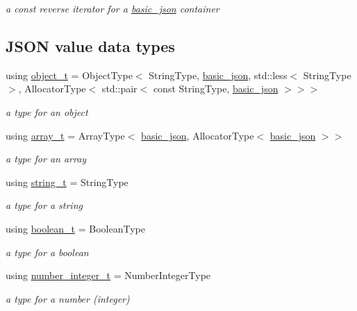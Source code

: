 \begin{DoxyCompactItemize}
\begin{DoxyCompactList}\small\item\em a const reverse iterator for a \hyperlink{a00025}{basic\+\_\+json} container \end{DoxyCompactList}\end{DoxyCompactItemize}
\subsection*{J\+S\+ON value data types}
\begin{DoxyCompactItemize}
\item 
using \hyperlink{a00025_a0ac9894c9de8dc551cf2e5f1c605537f}{object\+\_\+t} = Object\+Type$<$ String\+Type, \hyperlink{a00025}{basic\+\_\+json}, std\+::less$<$ String\+Type $>$, Allocator\+Type$<$ std\+::pair$<$ const String\+Type, \hyperlink{a00025}{basic\+\_\+json} $>$$>$$>$
\begin{DoxyCompactList}\small\item\em a type for an object \end{DoxyCompactList}\item 
using \hyperlink{a00025_ab00b882d39306d663c23dab110f5cae0}{array\+\_\+t} = Array\+Type$<$ \hyperlink{a00025}{basic\+\_\+json}, Allocator\+Type$<$ \hyperlink{a00025}{basic\+\_\+json} $>$$>$
\begin{DoxyCompactList}\small\item\em a type for an array \end{DoxyCompactList}\item 
using \hyperlink{a00025_ab63e618bbb0371042b1bec17f5891f42}{string\+\_\+t} = String\+Type
\begin{DoxyCompactList}\small\item\em a type for a string \end{DoxyCompactList}\item 
using \hyperlink{a00025_af3bc3e83aa162d7ba4df16a949872723}{boolean\+\_\+t} = Boolean\+Type
\begin{DoxyCompactList}\small\item\em a type for a boolean \end{DoxyCompactList}\item 
using \hyperlink{a00025_ac4b10b2364f26ce47bdb9a413ff04a59}{number\+\_\+integer\+\_\+t} = Number\+Integer\+Type
\begin{DoxyCompactList}\small\item\em a type for a number (integer) \end{DoxyCompactList}\item 
$$
\end{DoxyCompactItemize}
